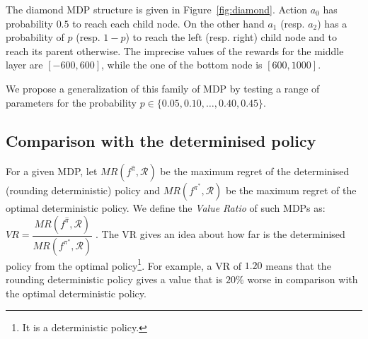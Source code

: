The diamond MDP structure is given in Figure~\ref{fig:diamond}. Action $a_0$ has probability $0.5$ to reach each child node.  
On the other hand $a_1$ (resp. $a_2$) has a probability of $p$ (resp. $1-p$) to reach the left (resp. right) child node and to reach its parent otherwise.
The imprecise values of the rewards for the middle layer are $[-600,600]$, while the one of the bottom node is $[600,1000]$.

We propose a generalization of this family of MDP by testing a range of parameters for the probability $p \in \{0.05,0.10,\dots,0.40,0.45\}$. %


\subsection{Comparison with the determinised policy}

For a given MDP, let $MR(f^{\hat{\pi}}, \mathcal{R})$ be the maximum regret of the determinised  (rounding deterministic) policy and $MR(f^{\pi^*}, \mathcal{R})$  be the maximum regret of the optimal deterministic policy. We define the \textit{Value Ratio} of such MDPs as: $VR = \dfrac{MR(f^{\hat{\pi}}, \mathcal{R})}{MR(f^{\pi^*}, \mathcal{R})}\;$.
The VR gives an idea about how far is the determinised policy from the optimal policy\footnote{ It is a deterministic policy.}. 
For example, a VR of $1.20$ means that the rounding deterministic policy gives a value that is $20\%$ worse in comparison with the optimal deterministic policy. 
%
  
  
  



